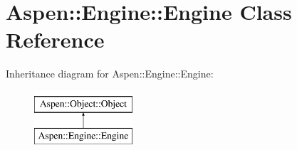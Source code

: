 \hypertarget{class_aspen_1_1_engine_1_1_engine}{\section{Aspen\-:\-:Engine\-:\-:Engine Class Reference}
\label{class_aspen_1_1_engine_1_1_engine}
}
Inheritance diagram for Aspen\-:\-:Engine\-:\-:Engine\-:\begin{figure}[H]
\begin{center}
\leavevmode
\includegraphics[height=2.000000cm]{de/d64/class_aspen_1_1_engine_1_1_engine}
\end{center}
\end{figure}

